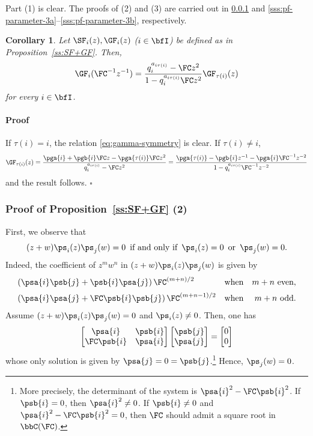 \documentclass[reqno]{amsart}
\numberwithin{equation}{section}
\newtheorem*{corollary}{Corollary}
\newenvironment{pf}{\medskip\paragraph{{\sc Proof}}}{\hfill$\square$\par\medskip}
\begin{document}
Part (1) is clear. The proofs of (2) and (3) are carried out in \ref{sss:pf-parameter-2} and \ref{sss:pf-parameter-3a}--\ref{sss:pf-parameter-3b}, respectively.

\begin{corollary}
	Let $\SF_i(z), \GF_i(z)$ ($i\in\bfI$) be defined as in Proposition~\ref{ss:SF+GF}.
	Then,
	\begin{equation}\label{eq:gamma-symmetry}
		\GF_i(\FC^{-1}z^{-1})
		=
		\frac{q_i^{a_{i\tau(i)}}-\FC z^2}{1-q_i^{a_{i\tau(i)}}\FC z^2}
		\GF_{\tau(i)}(z)
	\end{equation}
	for every $i\in\bfI$.
\end{corollary}

\begin{pf}
If $\tau(i)=i$, the relation \eqref{eq:gamma-symmetry} is clear. If $\tau(i)\neq i$,
\begin{equation}
	\GF_{\tau(i)}(z)
	=\frac{\pga{i}+\pgb{i}\FC z-\pga{\tau(i)}\FC z^2}{q_i^{a_{i\tau(i)}}-\FC z^2}
	=\frac{\pga{\tau(i)}-\pgb{i}z^{-1}-\pga{i}\FC^{-1}z^{-2}}{1-q_i^{a_{i\tau(i)}}\FC^{-1}z^{-2}}
\end{equation}
and the result follows.
\end{pf}

\subsubsection{Proof of Proposition~\ref{ss:SF+GF} (2)}\label{sss:pf-parameter-2}
First, we observe that
\begin{equation}
(z+w)\ps_i(z)\ps_j(w)=0\,\mbox{ if and only if }\, \ps_i(z)=0\,\mbox{ or }\,\ps_j(w)=0.	
\end{equation}
Indeed, the coefficient of $z^mw^n$ in $(z+w)\ps_i(z)\ps_j(w)$ is given by
\begin{equation}
\begin{array}{lcr}
	(\psa{i} \psb{j}+\psb{i} \psa{j})\,\FC^{(m+n)/2} & \mbox{when} & m+n \text{ even},\\[2mm]
	(\psa{i} \psa{j}+\FC \psb{i} \psb{j})\,\FC^{(m+n-1)/2} & \mbox{when} &  m+n \text{ odd}.
\end{array}
\end{equation}
Assume $(z+w)\ps_i(z)\ps_j(w)=0$ and $\ps_i(z)\neq0$. Then, one has
\begin{equation}
\begin{bmatrix}
\psa{i} & \psb{i}\\ \FC \psb{i} & \psa{i}
\end{bmatrix}	
\begin{bmatrix}
\psb{j} \\ \psa{j}	
\end{bmatrix}
=
\begin{bmatrix}
0\\0	
\end{bmatrix}
\end{equation}
whose only solution is given by $\psa{j}=0=\psb{j}$.\footnote{
More precisely, the determinant of the system is 
$\psa{i}^2-\FC \psb{i}^2$. If $\psb{i}=0$, then $\psa{i}^2\neq0$. If $\psb{i}\neq 0$ and $\psa{i}^2-\FC \psb{i}^2=0$, then $\FC$ should admit a square root in $\bbC(\FC)$.} Hence, $\ps_j(w)=0$.
\end{document}
